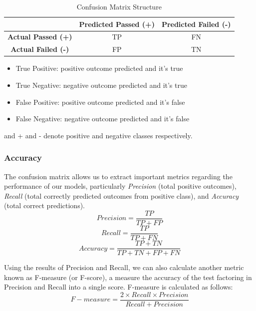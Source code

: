 \documentclass[conference]{IEEEtran}
\begin{document}
\begin{table}
\caption{Confusion Matrix Structure}
\begin{center}
\begin{tabular}{c|c|c} 
\hline
& \textbf{Predicted Passed (+)} & \textbf{Predicted Failed (-)} \\ 
\hline
\textbf{Actual Passed (+)} & TP & FN \\ 
\hline
\textbf{Actual Failed (-)} & FP & TN \\
\hline
\end{tabular}
\begin{itemize}
Structure of confusion matrix where:
\item{True Positive: positive outcome predicted and it’s true}
\item{True Negative: negative outcome predicted and it’s true}
\item{False Positive: positive outcome predicted and it’s false}
\item{False Negative: negative outcome predicted and it’s false}
\end{itemize} and + and - denote positive and negative classes respectively.
\end{center}
\end{table}

\subsubsection{Accuracy}
The confusion matrix allows us to extract important metrics regarding the performance of our models, particularly \textit{Precision} (total positive outcomes), \textit{Recall} (total correctly predicted outcomes from positive class), and \textit{Accuracy} (total correct predictions).
\begin{equation}
Precision=\frac{TP}{TP+FP}
\end{equation}
\begin{equation}
Recall=\frac{TP}{TP+FN}
\end{equation}
\begin{equation}
Accuracy=\frac{TP+TN}{TP+TN+FP+FN}
\end{equation}

Using the results of Precision and Recall, we can also calculate another metric known as F-measure (or F-score), a measure the accuracy of the test factoring in Precision and Recall into a single score. F-measure is calculated as follows:
\begin{equation}
F-measure=\frac{2 \times Recall \times Precision}{Recall+Precision}
\end{equation}
\end{document}
